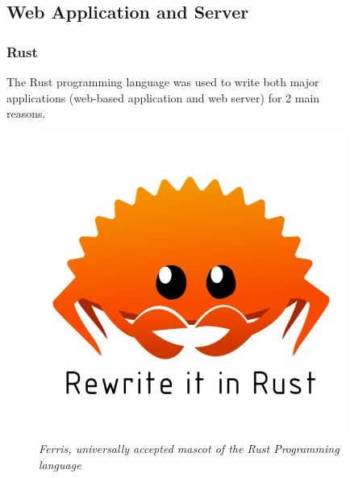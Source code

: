 \documentclass[8pt,compress,aspectratio=169]{beamer}
\begin{document}
\subsection{Web Application and Server}
\begin{frame}
  \frametitle{Rust}
  \begin{minipage}{0.75\textwidth}
    The Rust programming language was used to write both major \\ 
    applications (web-based application and web server) for 2 main \\ reasons.
  \end{minipage}
  \hfill
  \begin{minipage}{0.20\textwidth}
    \begin{figure}
      \includegraphics[width=\textwidth]{assets/misc/rewrite-it-in-rust.jpg}
      \caption{\it Ferris, universally accepted mascot of the Rust Programming language}
    \end{figure}


\end{minipage}
\end{frame}
\end{document}
